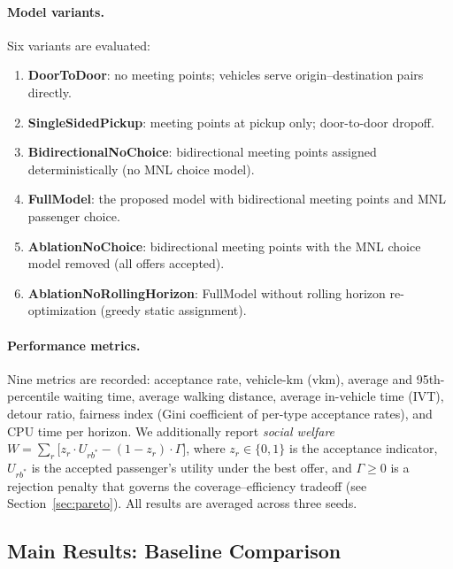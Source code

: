 \paragraph{Model variants.}
Six variants are evaluated:
\begin{enumerate}
  \item \textbf{DoorToDoor}: no meeting points; vehicles serve origin--destination
        pairs directly.
  \item \textbf{SingleSidedPickup}: meeting points at pickup only; door-to-door
        dropoff.
  \item \textbf{BidirectionalNoChoice}: bidirectional meeting points assigned
        deterministically (no MNL choice model).
  \item \textbf{FullModel}: the proposed model with bidirectional meeting points
        and MNL passenger choice.
  \item \textbf{AblationNoChoice}: bidirectional meeting points with the MNL
        choice model removed (all offers accepted).
  \item \textbf{AblationNoRollingHorizon}: FullModel without rolling horizon
        re-optimization (greedy static assignment).
\end{enumerate}

\paragraph{Performance metrics.}
Nine metrics are recorded: acceptance rate, vehicle-km (vkm), average and
95th-percentile waiting time, average walking distance, average in-vehicle
time (IVT), detour ratio, fairness index (Gini coefficient of per-type
acceptance rates), and CPU time per horizon. We additionally report \emph{social welfare}
$W = \sum_{r} \bigl[z_r \cdot U_{rb^*} - (1 - z_r) \cdot \Gamma\bigr]$,
where $z_r \in \{0,1\}$ is the acceptance indicator, $U_{rb^*}$ is the
accepted passenger's utility under the best offer, and $\Gamma \geq 0$ is
a rejection penalty that governs the coverage--efficiency tradeoff (see
Section~\ref{sec:pareto}). All results are averaged across three seeds.

\subsection{Main Results: Baseline Comparison}

